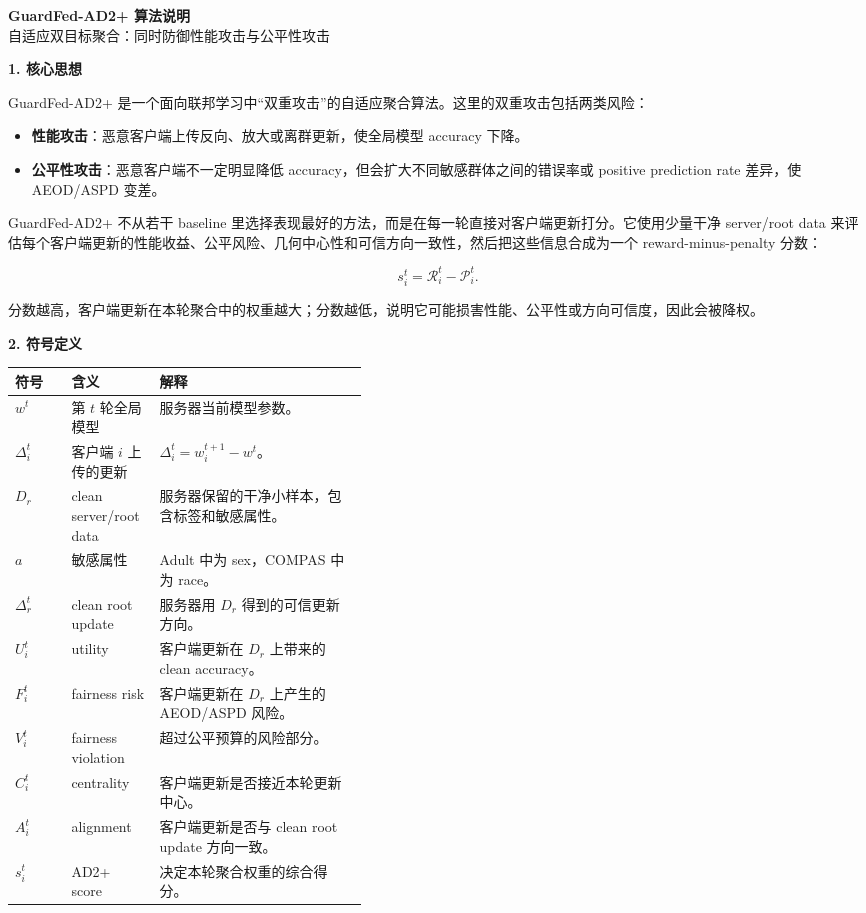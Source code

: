 \documentclass[11pt]{article}
\newcommand{\sectiontitle}[1]{%
  \vspace{0.7em}
  {\Large\bfseries\color{headblue} #1}\par
  \vspace{0.2em}
}
\begin{document}
\begin{center}
{\Huge\bfseries\color{titleblue} GuardFed-AD2+ 算法说明}\\[0.45em]
{\large 自适应双目标聚合：同时防御性能攻击与公平性攻击}
\end{center}

\sectiontitle{1. 核心思想}

GuardFed-AD2+ 是一个面向联邦学习中“双重攻击”的自适应聚合算法。这里的双重攻击包括两类风险：

\begin{itemize}
  \item \textbf{性能攻击}：恶意客户端上传反向、放大或离群更新，使全局模型 accuracy 下降。
  \item \textbf{公平性攻击}：恶意客户端不一定明显降低 accuracy，但会扩大不同敏感群体之间的错误率或 positive prediction rate 差异，使 AEOD/ASPD 变差。
\end{itemize}

GuardFed-AD2+ 不从若干 baseline 里选择表现最好的方法，而是在每一轮直接对客户端更新打分。它使用少量干净 server/root data 来评估每个客户端更新的性能收益、公平风险、几何中心性和可信方向一致性，然后把这些信息合成为一个 reward-minus-penalty 分数：

\[
s_i^t=\mathcal{R}_i^t-\mathcal{P}_i^t .
\tag{1}
\]

分数越高，客户端更新在本轮聚合中的权重越大；分数越低，说明它可能损害性能、公平性或方向可信度，因此会被降权。

\sectiontitle{2. 符号定义}

\begin{tabularx}{\linewidth}{>{\raggedright\arraybackslash}p{0.16\linewidth} >{\raggedright\arraybackslash}p{0.25\linewidth} X}
\toprule
\textbf{符号} & \textbf{含义} & \textbf{解释} \\
\midrule
$w^t$ & 第 $t$ 轮全局模型 & 服务器当前模型参数。 \\
$\Delta_i^t$ & 客户端 $i$ 上传的更新 & $\Delta_i^t=w_i^{t+1}-w^t$。 \\
$D_r$ & clean server/root data & 服务器保留的干净小样本，包含标签和敏感属性。 \\
$a$ & 敏感属性 & Adult 中为 sex，COMPAS 中为 race。 \\
$\Delta_r^t$ & clean root update & 服务器用 $D_r$ 得到的可信更新方向。 \\
$U_i^t$ & utility & 客户端更新在 $D_r$ 上带来的 clean accuracy。 \\
$F_i^t$ & fairness risk & 客户端更新在 $D_r$ 上产生的 AEOD/ASPD 风险。 \\
$V_i^t$ & fairness violation & 超过公平预算的风险部分。 \\
$C_i^t$ & centrality & 客户端更新是否接近本轮更新中心。 \\
$A_i^t$ & alignment & 客户端更新是否与 clean root update 方向一致。 \\
$s_i^t$ & AD2+ score & 决定本轮聚合权重的综合得分。 \\
\bottomrule
\end{tabularx}
\end{document}
